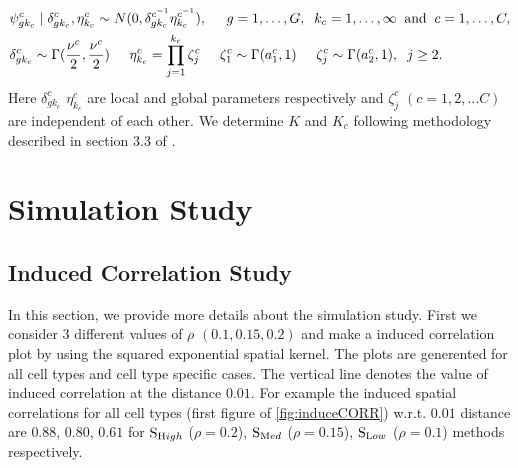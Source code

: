 \documentclass[
]{book}
\begin{document}
\begin{equation}
\begin{split}
& \psi^{c}_{gk_{c}} \mid \delta^{c}_{gk_{c}}, \eta^{c}_{k_{c}} \sim N(0, {\delta^{c^{-1}}_{gk_{c}}} {\eta^{c^{-1}}_{k_{c}}}), \hspace{0.5cm} g = 1, \dots , G, \hspace{0.2cm} k_{c} = 1, \dots, \infty \hspace{0.2cm} \text{and} \hspace{0.2cm} c = 1, \dots , C,\\
& \delta^{c}_{gk_{c}} \sim \Gamma(\frac{\nu^{c}}{2}, \frac{\nu^{c}}{2}) \hspace{0.5cm}  \eta^{c}_{k_{c}} = \prod_{j=1}^{k_{c}} \zeta^{c}_{j} \hspace{0.5cm} \zeta^{c}_{1} \sim \Gamma(a^{c}_{1},1) \hspace{0.5cm}  \zeta^{c}_{j} \sim \Gamma(a^{c}_{2},1), \hspace{0.2cm} j \ge 2.
\end{split}
\end{equation}
Here \(\delta^{c}_{gk_{c}}\) \(\eta^{c}_{k_{c}}\) are local and global parameters respectively and \(\zeta_{j}^{c}\) \((c=1,2, \dots C)\) are independent of each other. We determine \(K\) and \(K_{c}\) following methodology described in section 3.3 of \citet{de2018bayesian}.

\hypertarget{simulation}{%
\chapter{Simulation Study}\label{simulation}}

\hypertarget{induced-correlation-study}{%
\section{Induced Correlation Study}\label{induced-correlation-study}}

In this section, we provide more details about the simulation study. First we consider \(3\) different values of \(\rho\) \((0.1,0.15,0.2)\) and make a induced correlation plot by using the squared exponential spatial kernel. The plots are generented for all cell types and cell type specific cases. The vertical line denotes the value of induced correlation at the distance \(0.01\). For example the induced spatial correlations for all cell types (first figure of \ref{fig:induceCORR}) w.r.t. \(0.01\) distance are \(0.88\), \(0.80\), \(0.61\) for \(\text S_{\text High}\) (\(\rho = 0.2\)), \(\text S_{\text Med}\) (\(\rho = 0.15\)), \(\text S_{\text Low}\) (\(\rho = 0.1\)) methods respectively.
\end{document}
